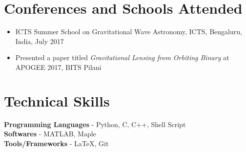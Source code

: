 \documentclass[margin, centered]{res}
\begin{document}
\begin{resume}
\section{Conferences and Schools Attended}
\begin{itemize}[leftmargin=*]
 \item ICTS Summer School on Gravitational Wave Astronomy, ICTS, Bengaluru, India, July 2017
 \item Presented a paper titled \textit{Gravitational Lensing from Orbiting Binary} at APOGEE 2017, BITS Pilani
 \end{itemize}
\section{Technical \hspace{2mm} Skills}
\textbf{Programming Languages} - Python, C, C++, Shell Script\\
\textbf{Softwares} - MATLAB, Maple \\
\textbf{Tools/Frameworks} - \LaTeX, Git






\end{resume}
\end{document}
